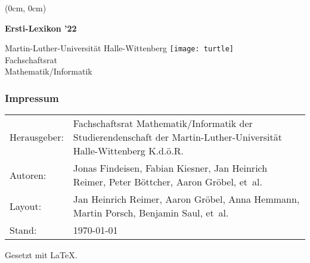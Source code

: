 \thispagestyle{empty}
\pagecolor{coverbackground}
\color{coverforeground}
{
    \setlength{\parindent}{0pt}
    \sffamily
    \begin{textblock*}{\textwidth}(0cm, 0cm)%
        \begin{sideways}
            \begin{minipage}{\textheight}
                \fontsize{1.5cm}{1.5cm}\selectfont%
                \bfseries
                \hspace{-0.1em}
                Ersti-Lexikon ’22
                \hfill
            \end{minipage}
        \end{sideways}%
    \end{textblock*}
    {
        \fontsize{0.45cm}{0.45cm}\selectfont
        Martin-Luther-Universität \hfill
        Halle-Wittenberg
    }
    \vfill
    \texttt{[image: turtle]} \\[0.5cm]
    {%
        \fontsize{0.675cm}{0.675cm}\selectfont
        Fachschaftsrat \\[0.5ex]
        Mathematik/Informatik
    }%
}%
\newpage
\restoregeometry
\nopagecolor
\color{black}

\thispagestyle{empty}
\subsubsection{Impressum}
\begin{tabu} to 
    Herausgeber: & Fachschaftsrat Mathematik/Informatik der
        Studierendenschaft der Martin-Luther-Universität Halle-Wittenberg K.d.ö.R. \\
    Autoren: &
        Jonas Findeisen,
        Fabian Kiesner,
        Jan Heinrich Reimer,
        Peter Böttcher,
        Aaron Gröbel,
        et~al. \\
    Layout: & 
        Jan Heinrich Reimer,
        Aaron Gröbel,
        Anna Hemmann,
        Martin Porsch,
        Benjamin Saul, 
        et~al. \\
    Stand: & \today
\end{tabu}
{\scriptsize Gesetzt mit \LaTeX.}
\newpage

